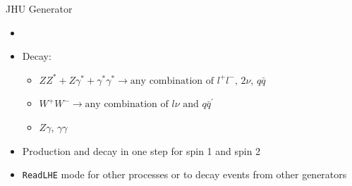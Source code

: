 \documentclass[usenames,dvipsnames,svgnames,table]{beamer}
\newcommand{\spin}[1]{\text{spin }#1}
\begin{document}
\begin{frame}{JHU Generator}
\begin{itemize} \small
{}
\item
\item Decay:
\begin{itemize}[label={$\to$}] \small
\item \(ZZ^*+Z\gamma^*+\gamma^*\gamma^*\to \text{any combination of $l^+l^-$, $2\nu$, $q\bar{q}$}\)
\item \(W^+W^-\to \text{any combination of $l\nu$ and $q\bar{q}^\prime$}\)
\item $Z\gamma$, $\gamma\gamma$
\end{itemize}
\item Production and decay in one step for spin 1 and spin 2
\item \texttt{ReadLHE} mode for other processes or to decay events from other generators
\end{itemize}
\end{frame}
\end{document}
